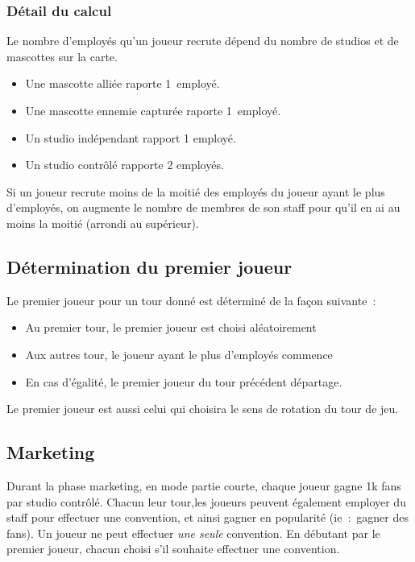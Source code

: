             \subsubsection{Détail du calcul}
                Le nombre d'employés qu'un joueur recrute dépend du nombre de studios et de mascottes sur la carte.
                \begin{itemize}
                    \item Une mascotte alliée raporte 1 employé.
                    \item Une mascotte ennemie capturée raporte 1 employé.
                    \item Un studio indépendant rapport 1 employé.
                    \item Un studio contrôlé rapporte 2 employés.
                \end{itemize}

                Si un joueur recrute moins de la moitié des employés du joueur ayant le plus d'employés, on augmente
                le nombre de membres de son staff pour qu'il en ai au moins la moitié (arrondi au supérieur).

        \subsection{Détermination du premier joueur}

            Le premier joueur pour un tour donné est déterminé de la façon suivante :
            \begin{itemize}
                \item Au premier tour, le premier joueur est choisi aléatoirement
                \item Aux autres tour, le joueur ayant le plus d'employés commence
                \item En cas d'égalité, le premier joueur du tour précédent départage.
            \end{itemize}

            Le premier joueur est aussi celui qui choisira le sens de rotation du tour de jeu.

        \subsection{Marketing}

            Durant la phase marketing, en mode partie courte, chaque joueur gagne 1k fans par
            studio contrôlé.
            \newline
            Chacun leur tour,les joueurs peuvent également employer du staff pour effectuer
            une convention, et ainsi gagner en popularité (ie : gagner des fans).
            Un joueur ne peut effectuer \emph{une seule} convention.
            \newline
            En débutant par le premier joueur, chacun choisi s'il souhaite effectuer une convention.
